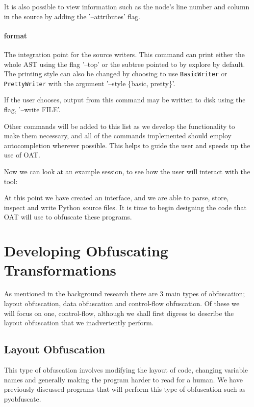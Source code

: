 \documentclass[twoside,a4paper]{report}
\begin{document}
It is also possible to view information such as the node's line number and column in the source by adding the '--attributes' flag.

\paragraph{format}

The integration point for the source writers. This command can print either the whole AST using the flag '--top' or the subtree pointed
to by explore by default. The printing style can also be changed by choosing to use \texttt{BasicWriter} or \texttt{PrettyWriter} with
the argument '--style \{basic, pretty\}'.

If the user chooses, output from this command may be written to disk using the flag, '--write FILE'.

Other commands will be added to this list as we develop the functionality to make them necessary, and all of the commands implemented
should employ autocompletion wherever possible. This helps to guide the user and speeds up the use of OAT.

Now we can look at an example session, to see how the user will interact with the tool:



At this point we have created an interface, and we are able to parse, store, inspect and write Python source
files. It is time to begin designing the code that OAT will use to obfuscate these programs.

\section{Developing Obfuscating Transformations}

As mentioned in the background research there are 3 main types of obfuscation; layout obfuscation, data
obfuscation and control-flow obfuscation. Of these we will focus on one, control-flow, although we shall
first digress to describe the layout obfuscation that we inadvertently perform.

\subsection{Layout Obfuscation}

This type of obfuscation involves modifying the layout of code, changing variable names and
generally making the program harder to read for a human. We have previously discussed programs that will
perform this type of obfuscation such as pyobfuscate.
\end{document}
